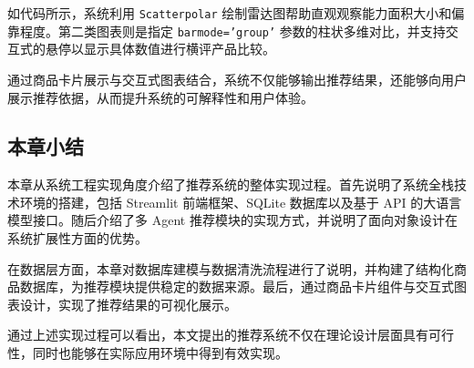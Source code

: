 \documentclass{nkuthesis}
\begin{document}
如代码所示，系统利用 \texttt{Scatterpolar} 绘制雷达图帮助直观观察能力面积大小和偏靠程度。第二类图表则是指定 \texttt{barmode='group'} 参数的柱状多维对比，并支持交互式的悬停以显示具体数值进行横评产品比较。

通过商品卡片展示与交互式图表结合，系统不仅能够输出推荐结果，还能够向用户展示推荐依据，从而提升系统的可解释性和用户体验。

\subsection{本章小结}

本章从系统工程实现角度介绍了推荐系统的整体实现过程。首先说明了系统全栈技术环境的搭建，包括 Streamlit 前端框架、SQLite 数据库以及基于 API 的大语言模型接口。随后介绍了多 Agent 推荐模块的实现方式，并说明了面向对象设计在系统扩展性方面的优势。

在数据层方面，本章对数据库建模与数据清洗流程进行了说明，并构建了结构化商品数据库，为推荐模块提供稳定的数据来源。最后，通过商品卡片组件与交互式图表设计，实现了推荐结果的可视化展示。

通过上述实现过程可以看出，本文提出的推荐系统不仅在理论设计层面具有可行性，同时也能够在实际应用环境中得到有效实现。

\newpage

\printbibliography
\end{document}

